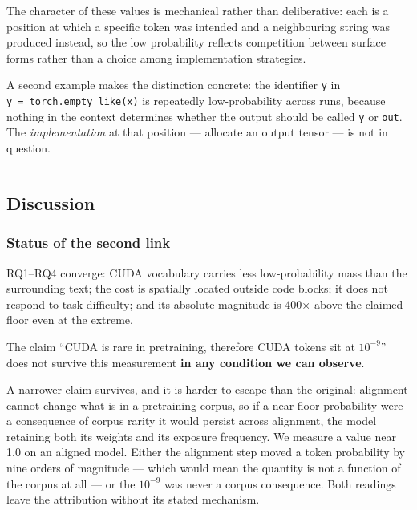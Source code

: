 \documentclass[
  11pt,
]{article}
\begin{document}
The character of these values is mechanical rather than deliberative:
each is a position at which a specific token was intended and a
neighbouring string was produced instead, so the low probability
reflects competition between surface forms rather than a choice among
implementation strategies.

A second example makes the distinction concrete: the identifier
\texttt{y} in \texttt{y\ =\ torch.empty\_like(x)} is repeatedly
low-probability across runs, because nothing in the context determines
whether the output should be called \texttt{y} or \texttt{out}. The
\emph{implementation} at that position --- allocate an output tensor ---
is not in question.

\begin{center}\rule{0.5\linewidth}{0.5pt}\end{center}

\hypertarget{discussion}{%
\subsection{Discussion}\label{discussion}}

\hypertarget{status-of-the-second-link}{%
\subsubsection{Status of the second
link}\label{status-of-the-second-link}}

RQ1--RQ4 converge: CUDA vocabulary carries less low-probability mass
than the surrounding text; the cost is spatially located outside code
blocks; it does not respond to task difficulty; and its absolute
magnitude is 400× above the claimed floor even at the extreme.

The claim ``CUDA is rare in pretraining, therefore CUDA tokens sit at
\(10^{-9}\)'' does not survive this measurement \textbf{in any condition
we can observe}.

A narrower claim survives, and it is harder to escape than the original:
alignment cannot change what is in a pretraining corpus, so if a
near-floor probability were a consequence of corpus rarity it would
persist across alignment, the model retaining both its weights and its
exposure frequency. We measure a value near 1.0 on an aligned model.
Either the alignment step moved a token probability by nine orders of
magnitude --- which would mean the quantity is not a function of the
corpus at all --- or the \(10^{-9}\) was never a corpus consequence.
Both readings leave the attribution without its stated mechanism.
\end{document}
